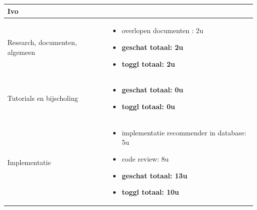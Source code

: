 \documentclass{article}
\begin{document}
\begin{center}
\begin{tabularx}{\textwidth}[t]{XX}
\arrayrulecolor{green}\hline


\vspace{.1 mm}
\textbf{\textcolor{myGreen}{\large{Ivo}}} \vspace{.1 mm} & \\
\hline
\vspace{1 mm}
Research, documenten, algemeen & 
\begin{minipage}[t]{\linewidth}%
\vspace{1 mm}
\begin{itemize}
\item overlopen documenten : 2u
\item \textbf{geschat totaal: 2u}
\item \textbf{toggl totaal: 2u}
\end{itemize} 
\vspace{1 mm}
\end{minipage}\\

\arrayrulecolor{black}\hline

\vspace{1 mm}
Tutorials en bijscholing & 
\begin{minipage}[t]{\linewidth}%
\vspace{1 mm}
\begin{itemize}
\item \textbf{geschat totaal: 0u}
\item \textbf{toggl totaal: 0u}
\end{itemize} 
\vspace{1 mm}
\end{minipage}\\

\arrayrulecolor{black}\hline


\vspace{1 mm}
Implementatie & 
\begin{minipage}[t]{\linewidth}%
\vspace{1 mm}
\begin{itemize}
\item implementatie recommender in database: 5u
\item code review:  8u
\item \textbf{geschat totaal: 13u}
\item \textbf{toggl totaal: 10u}
\end{itemize} 
\vspace{1 mm}
\end{minipage}\\



\end{tabularx}
\end{center}
\end{document}
